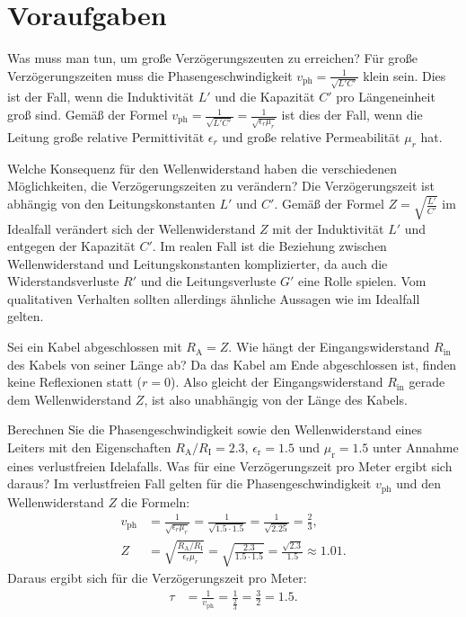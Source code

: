 \documentclass[ngerman]{scrartcl}
\theoremstyle{definition}
\begin{document}
	\section{Voraufgaben}
		\begin{voraufgabe}{Was muss man tun, um große Verzögerungszeuten zu erreichen?}
			Für große Verzögerungszeiten muss die Phasengeschwindigkeit $v_\mathrm{ph} = \frac{1}{\sqrt{L'C'}}$ klein sein. Dies ist der Fall, wenn die Induktivität $L'$ und die Kapazität $C'$ pro Längeneinheit groß sind. Gemäß der Formel $v_\mathrm{ph} = \frac{1}{\sqrt{L'C'}} = \frac{1}{\sqrt{\epsilon_r \mu_r}}$ ist dies der Fall, wenn die Leitung große relative Permittivität $\epsilon_r$ und große relative Permeabilität $\mu_r$ hat.
		\end{voraufgabe}
		\begin{voraufgabe}{Welche Konsequenz für den Wellenwiderstand haben die verschiedenen Möglichkeiten, die Verzögerungszeiten zu verändern?}
			Die Verzögerungszeit ist abhängig von den Leitungskonstanten $L'$ und $C'$. Gemäß der Formel $Z = \sqrt{\frac{L'}{C'}}$ im Idealfall verändert sich der Wellenwiderstand $Z$ mit der Induktivität $L'$ und entgegen der Kapazität $C'$. Im realen Fall ist die Beziehung zwischen Wellenwiderstand und Leitungskonstanten komplizierter, da auch die Widerstandsverluste $R'$ und die Leitungsverluste $G'$ eine Rolle spielen. Vom qualitativen Verhalten sollten allerdings ähnliche Aussagen wie im Idealfall gelten.
		\end{voraufgabe}
		\begin{voraufgabe}{Sei ein Kabel abgeschlossen mit $R_\mathrm{A} = Z$. Wie hängt der Eingangswiderstand $R_\mathrm{in}$ des Kabels von seiner Länge ab?}
			Da das Kabel am Ende abgeschlossen ist, finden keine Reflexionen statt ($r=0$). Also gleicht der Eingangswiderstand $R_\mathrm{in}$ gerade dem Wellenwiderstand $Z$, ist also unabhängig von der Länge des Kabels. 
		\end{voraufgabe}
		\begin{voraufgabe}{Berechnen Sie die Phasengeschwindigkeit sowie den Wellenwiderstand eines Leiters mit den Eigenschaften $R_\mathrm{A}/R_\mathrm{I} = 2.3$, $\epsilon_\mathrm{r} = 1.5$ und $\mu_\mathrm{r} = 1.5$ unter Annahme eines verlustfreien Idelafalls. Was für eine Verzögerungszeit pro Meter ergibt sich daraus?}
			Im verlustfreien Fall gelten für die Phasengeschwindigkeit $v_\mathrm{ph}$ und den Wellenwiderstand $Z$ die Formeln:
			\begin{align*}
				v_\mathrm{ph} &= \frac{1}{\sqrt{\epsilon_r \mu_r}} = \frac{1}{\sqrt{1.5 \cdot 1.5}} = \frac{1}{\sqrt{2.25}} = \frac{2}{3},\\
				Z &= \sqrt{\frac{R_\mathrm{A}/R_\mathrm{I}}{\epsilon_r \mu_r}} = \sqrt{\frac{2.3}{1.5 \cdot 1.5}} = \frac{\sqrt{2.3}}{1.5} \approx 1.01.
			\end{align*}
			Daraus ergibt sich für die Verzögerungszeit pro Meter:
			\begin{align*}
				\tau &= \frac{1}{v_\mathrm{ph}} = \frac{1}{\frac{2}{3}} = \frac{3}{2} =1.5.
			\end{align*}
			
		\end{voraufgabe}
\end{document}
